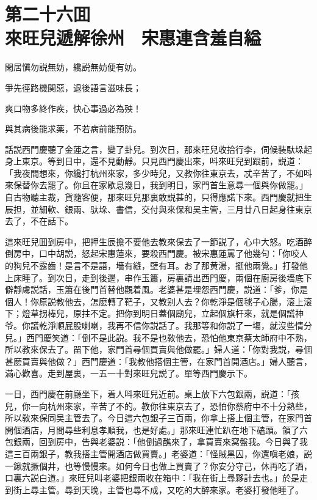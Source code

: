 
\chapter*{第二十六囬　\\來旺兒遞解徐州　宋惠連含羞自縊}


\begin{myquote}
閑居愼勿説無妨，纔説無妨便有妨。

爭先徑路機関惡，退後語言滋味長；

爽口物多終作疾，快心事過必為殃！

與其病後能求薬，不若病前能預防。
\end{myquote}

話説西門慶聽了金蓮之言，變了卦兒。到次日，那來旺兒收拾行李，伺候裝馱垛起身上東京。等到日中，還不見動靜。只見西門慶出來，呌來旺兒到跟前，説道：「我夜間想來，你纔打杭州來家，多少時兒，又教你往東京去，忒辛苦了，不如呌來保替你去罷了。你且在家歇息幾日，我到明日，家門首生意尋一個與你做罷。」自古物聽主裁，貨隨客便，那來旺兒那裏敢説甚的，只得應諾下來。西門慶就把生辰担，並細軟、銀兩、驮垛、書信，交付與來保和吴主管，三月廿八日起身往東京去了，不在話下。

這來旺兒囬到房中，把押生辰擔不要他去教來保去了一節説了，心中大怒。吃酒醉倒房中，口中胡説，怒起宋惠蓮來，要殺西門慶。被宋惠蓮罵了他幾句：「你咬人的狗兒不露齒！是言不是語，墻有縫，壁有耳。お了那黄湯，挺他兩覺。」打發他上床睡了。到次日，走到後邊，串作玉簫，房裏請出西門慶，兩個在廚房後墻底下僻靜䖏説話，玉簫在後門首替他觀着風。老婆甚是埋怨西門慶，説道：「爹，你是個人！你原説教他去，怎麽轉了靶子，又教别人去？你乾淨是個毬子心腸，滚上滚下；燈草拐棒兒，原拄不定。把你到明日蓋個廟兒，立起個旗杆來，就是個謊神爷。你謊乾淨順屁股喇喇，我再不信你説話了。我那等和你説了一塲，就沒些情分兒。」西門慶笑道：「倒不是此説。我不是也敎他去，恐怕他東京蔡太師府中不熟，所以教來保去了。㽞下他，家門首尋個買賣與他做罷。」婦人道：「你對我説，尋個甚麽買賣與他做？」西門慶道：「我教他搭個主管，在家門首開酒店。」婦人聽言，滿心歡喜。走到屋裏，一五一十對來旺兒説了。單等西門慶示下。

一日，西門慶在前廳坐下，着人呌來旺兒近前。桌上放下六包銀兩，説道：「孩兒，你一向杭州來家，辛苦了不的。教你往東京去了，恐怕你蔡府中不十分熟些，所以敎來保同吴主管去了。今日這六包銀子三百兩，你拿上搭上個主管，在家門首開個酒店，月間尋些利息孝順我，也是好處。」那來旺連忙趴在地下磕頭。領了六包銀兩，回到房中，告與老婆説：「他倒過醮來了，拿買賣來窝盤我。今日與了我這三百兩銀子，教我搭主管開酒店做買賣。」老婆道：「怪賊黑囚，你還嗔老娘，説一鍬就撅個井，也等慢慢來。如何今日也做上買賣了？你安分守己，休再吃了酒，口裏六説白道。」來旺兒叫老婆把銀兩收在箱中：「我在街上尋夥計去也。」於是走到街上尋主管。尋到天晚，主管也尋不成，又吃的大醉來家。老婆打發他睡了。

